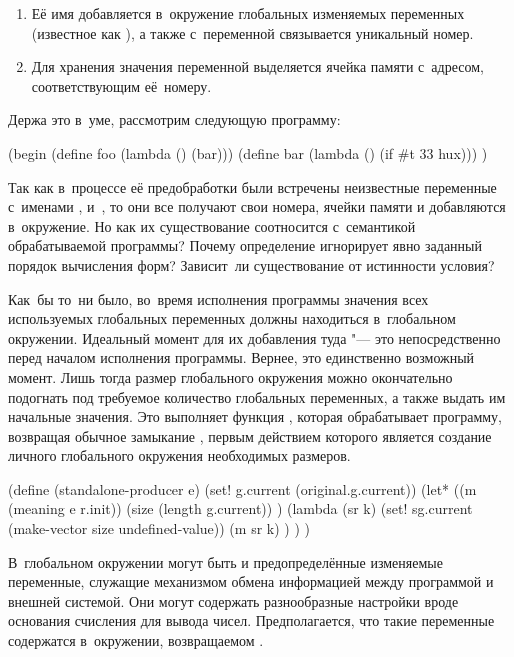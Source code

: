 \begin{enumerate}
  \item Её имя добавляется в~окружение глобальных изменяемых переменных
        (известное как ), а также с~переменной связывается
        уникальный номер.

  \item Для хранения значения переменной выделяется ячейка памяти
        с~адресом, соответствующим её~номеру.
\end{enumerate}

Держа это в~уме, рассмотрим следующую программу:

\begin{code:lisp}
(begin (define foo (lambda () (bar)))
       (define bar (lambda () (if #t 33 hux))) )
\end{code:lisp}

Так как в~процессе её предобработки были встречены неизвестные переменные
с~именами ,  и~, то они все получают свои номера, ячейки
памяти и добавляются в~окружение. Но как их существование соотносится
с~семантикой обрабатываемой программы? Почему определение  игнорирует
явно заданный порядок вычисления форм? Зависит~ли существование  от
истинности условия?

Как~бы то~ни было, во~время исполнения программы значения всех используемых
глобальных переменных должны находиться в~глобальном окружении. Идеальный момент
для их добавления туда "--- это непосредственно перед началом исполнения
программы. Вернее, это единственно возможный момент. Лишь тогда размер
глобального окружения можно окончательно подогнать под требуемое количество
глобальных переменных, а также выдать им начальные значения. Это выполняет
функция , которая обрабатывает программу, возвращая
обычное замыкание , первым действием которого является
создание личного глобального окружения необходимых размеров.

\begin{code:lisp}
(define (standalone-producer e)
  (set! g.current (original.g.current))
  (let* ((m (meaning e r.init))
         (size (length g.current)) )
    (lambda (sr k)
      (set! sg.current (make-vector size undefined-value))
      (m sr k) ) ) )
\end{code:lisp}

В~глобальном окружении могут быть и предопределённые изменяемые переменные,
служащие механизмом обмена информацией между программой и внешней системой. Они
могут содержать разнообразные настройки вроде основания счисления для вывода
чисел. Предполагается, что такие переменные содержатся в~окружении, возвращаемом
.


